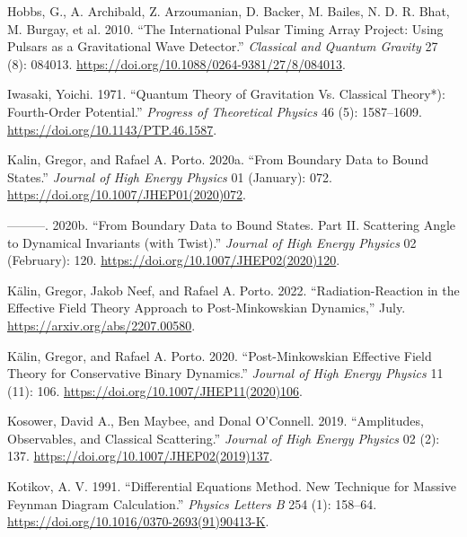 \documentclass[
  11pt,
  a4paper,
  DIV=11,
  numbers=noendperiod,
  oneside]{scrreprt}
\newlength{\cslhangindent}
\newlength{\cslentryspacingunit} %
\newenvironment{CSLReferences}[2] %
 {%
  \setlength{\parindent}{0pt}
  \ifodd #1
  \let\oldpar\par
  \def\par{\hangindent=\cslhangindent\oldpar}
  \fi
  \setlength{\parskip}{#2\cslentryspacingunit}
 }%
 {}
\DeclareRobustCommand{\[}{\begin{equation}}
\DeclareRobustCommand{\]}{\end{equation}}
\begin{document}
\begin{CSLReferences}{1}{0}
\leavevmode{}%
Hobbs, G., A. Archibald, Z. Arzoumanian, D. Backer, M. Bailes, N. D. R.
Bhat, M. Burgay, et al. 2010. {``The International Pulsar Timing Array
Project: Using Pulsars as a Gravitational Wave Detector.''}
\emph{Classical and Quantum Gravity} 27 (8): 084013.
\url{https://doi.org/10.1088/0264-9381/27/8/084013}.

\leavevmode{}%
Iwasaki, Yoichi. 1971. {``Quantum {Theory} of {Gravitation} Vs.
{Classical Theory}*): {Fourth-Order Potential}.''} \emph{Progress of
Theoretical Physics} 46 (5): 1587--1609.
\url{https://doi.org/10.1143/PTP.46.1587}.

\leavevmode{}%
Kalin, Gregor, and Rafael A. Porto. 2020a. {``From Boundary Data to
Bound States.''} \emph{Journal of High Energy Physics} 01 (January):
072. \url{https://doi.org/10.1007/JHEP01(2020)072}.

\leavevmode{}%
---------. 2020b. {``From Boundary Data to Bound States. {Part II}.
{Scattering} Angle to Dynamical Invariants (with Twist).''}
\emph{Journal of High Energy Physics} 02 (February): 120.
\url{https://doi.org/10.1007/JHEP02(2020)120}.

\leavevmode{}%
Kälin, Gregor, Jakob Neef, and Rafael A. Porto. 2022.
{``Radiation-{Reaction} in the {Effective Field Theory Approach} to
{Post-Minkowskian Dynamics},''} July.
\url{https://arxiv.org/abs/2207.00580}.

\leavevmode{}%
Kälin, Gregor, and Rafael A. Porto. 2020. {``Post-{Minkowskian Effective
Field Theory} for {Conservative Binary Dynamics}.''} \emph{Journal of
High Energy Physics} 11 (11): 106.
\url{https://doi.org/10.1007/JHEP11(2020)106}.

\leavevmode{}%
Kosower, David A., Ben Maybee, and Donal O'Connell. 2019. {``Amplitudes,
Observables, and Classical Scattering.''} \emph{Journal of High Energy
Physics} 02 (2): 137. \url{https://doi.org/10.1007/JHEP02(2019)137}.

\leavevmode{}%
Kotikov, A. V. 1991. {``Differential Equations Method. {New} Technique
for Massive {Feynman} Diagram Calculation.''} \emph{Physics Letters B}
254 (1): 158--64. \url{https://doi.org/10.1016/0370-2693(91)90413-K}.


\end{CSLReferences}
\end{document}
